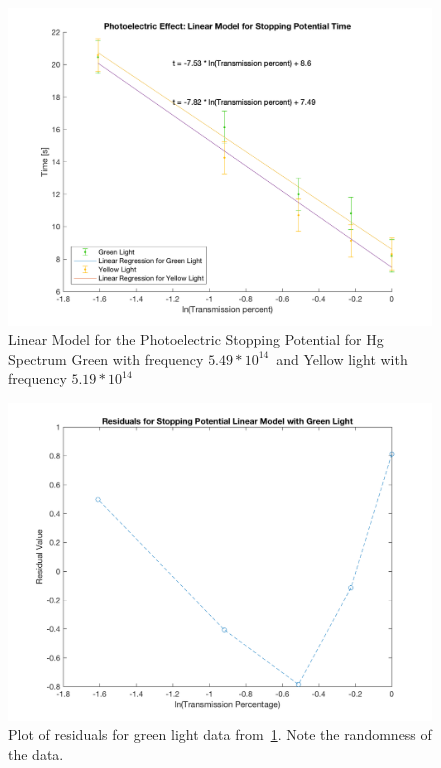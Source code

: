 \documentclass[]{article}
\newcommand{\yellowFreq}{$5.19 * 10^{14}$}
\newcommand{\greenFreq}{$5.49 * 10^{14}$}
\begin{document}
\begin{figure}[H]
    \includegraphics[width=\textwidth]{../img/linear.png}
    \caption{Linear Model for the Photoelectric Stopping Potential for Hg
    Spectrum Green with frequency \greenFreq\ and Yellow light with frequency
    \yellowFreq}\label{fig:linear}
\end{figure}
\begin{figure}[H]
    \includegraphics[width=\textwidth]{../img/residgreen.png}
    \caption{Plot of residuals for green light data
    from~\ref{fig:linear}. Note the randomness of the data.}\label{fig:residgreen}
\end{figure}
\end{document}

